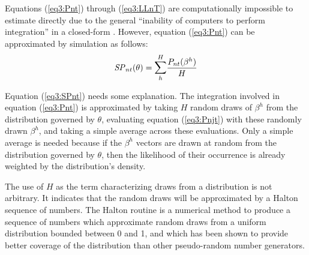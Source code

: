 \documentclass[../main.tex]{subfiles}
\begin{document}
Equations (\ref{eq3:Pnt}) through (\ref{eq3:LLnT}) are computationally impossible to estimate directly due to the general \enquote{inability of computers to perform integration} in a closed-form \parencite[2]{Train2002}.
However, equation (\ref{eq3:Pnt}) can be approximated by simulation as follows:
\begin{equation}
	\label{eq3:SPnt}
	\mathit{SP}_{nt}(\theta) = \mathlarger{\sum}_h^H \frac{ P_{nt}(\beta^h) }{H}
\end{equation}

Equation (\ref{eq3:SPnt}) needs some explanation.
The integration involved in equation (\ref{eq3:Pnt}) is approximated by taking $H$ random draws of $\beta^h$ from the distribution governed by $\theta$, evaluating equation (\ref{eq3:Pnjt}) with these randomly drawn $\beta^h$, and taking a simple average across these evaluations.
Only a simple average is needed because if the $\beta^h$ vectors are drawn at random from the distribution governed by $\theta$, then the likelihood of their occurrence is already weighted by the distribution's density.

The use of $H$ as the term characterizing draws from a distribution is not arbitrary.
It indicates that the random draws will be approximated by a Halton sequence of numbers.
The Halton routine is a numerical method to produce a sequence of numbers which approximate random draws from a uniform distribution bounded between 0 and 1, and which has been shown to provide better coverage of the distribution than other pseudo-random{\footnotemark} number generators.{\footnotemark}

\addtocounter{footnote}{-2}
\end{document}
